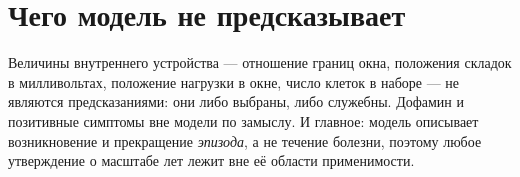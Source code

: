 \documentclass[11pt,a4paper]{article}
\begin{document}
\section{Чего модель не предсказывает}
Величины внутреннего устройства --- отношение границ окна, положения складок в милливольтах,
положение нагрузки в окне, число клеток в наборе --- не являются предсказаниями: они либо выбраны,
либо служебны. Дофамин и позитивные симптомы вне модели по замыслу. И главное: модель описывает
возникновение и прекращение \emph{эпизода}, а не течение болезни, поэтому любое утверждение о
масштабе лет лежит вне её области применимости.
\end{document}
